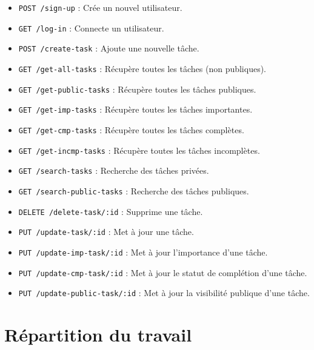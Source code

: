 \documentclass[a4paper,12pt]{article}
\begin{document}
\begin{itemize}
    \item \texttt{POST /sign-up} : Crée un nouvel utilisateur.
    \item \texttt{GET /log-in} : Connecte un utilisateur.
    \item \texttt{POST /create-task} : Ajoute une nouvelle tâche.
    \item \texttt{GET /get-all-tasks} : Récupère toutes les tâches (non publiques).
    \item \texttt{GET /get-public-tasks} : Récupère toutes les tâches publiques.
    \item \texttt{GET /get-imp-tasks} : Récupère toutes les tâches importantes.
    \item \texttt{GET /get-cmp-tasks} : Récupère toutes les tâches complètes.
    \item \texttt{GET /get-incmp-tasks} : Récupère toutes les tâches incomplètes.
    \item \texttt{GET /search-tasks} : Recherche des tâches privées.
    \item \texttt{GET /search-public-tasks} : Recherche des tâches publiques.
    \item \texttt{DELETE /delete-task/:id} : Supprime une tâche.
    \item \texttt{PUT /update-task/:id} : Met à jour une tâche.
    \item \texttt{PUT /update-imp-task/:id} : Met à jour l'importance d'une tâche.
    \item \texttt{PUT /update-cmp-task/:id} : Met à jour le statut de complétion d'une tâche.
    \item \texttt{PUT /update-public-task/:id} : Met à jour la visibilité publique d'une tâche.
\end{itemize}

\newpage

\section{Répartition du travail}
\end{document}
